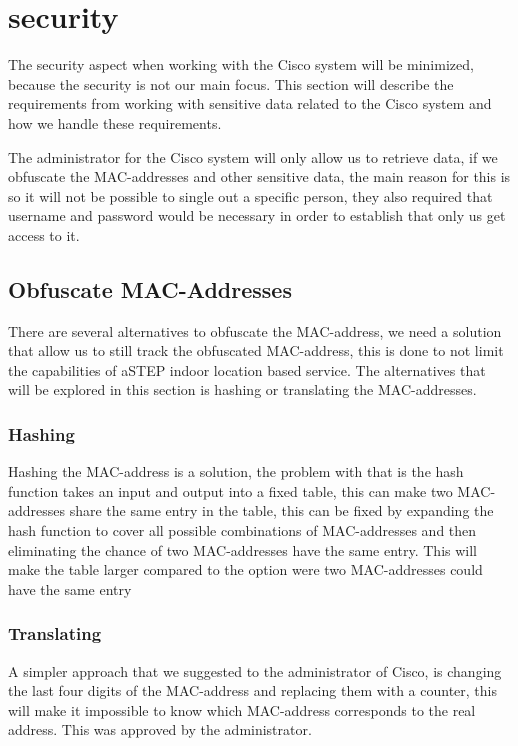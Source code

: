 \section{security}
The security aspect when working with the Cisco system will be minimized, because the security is not our main focus. This section will describe the requirements from working with sensitive data related to the Cisco system and how we handle these requirements.

The administrator for the Cisco system will only allow us to retrieve data, if we obfuscate the MAC-addresses and other sensitive data, the main reason for this is so it will not be possible to single out a specific person, they also required that username and password would be necessary in order to establish that only us get access to it. 

\subsection{Obfuscate MAC-Addresses}
There are several alternatives to obfuscate the MAC-address, we need a solution that allow us to still track the obfuscated MAC-address, this is done to not limit the capabilities of aSTEP indoor location based service. The alternatives that will be explored in this section is hashing or translating the MAC-addresses.

\subsubsection{Hashing}
Hashing the MAC-address is a solution, the problem with that is the hash function takes an input and output into a fixed table, this can make two MAC-addresses share the same entry in the table, this can be fixed by expanding the hash function to cover all possible combinations of MAC-addresses and then eliminating the chance of two MAC-addresses have the same entry. This will make the table larger compared to the option were two MAC-addresses could have the same entry

\subsubsection{Translating}
A simpler approach that we suggested to the administrator of Cisco, is changing the last four digits of the MAC-address and replacing them with a counter, this will make it impossible to know which MAC-address corresponds to the real address. This was approved by the administrator.


